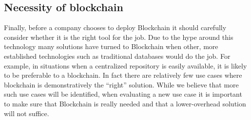 

\subsection{Necessity of blockchain}
Finally, before a company chooses to deploy Blockchain it should carefully consider whether it is the right tool for the job.  Due to the hype around this technology many solutions have turned to Blockchain when other, more established technologies such as traditional databases would do the job. For example, in situations when a centralized repository is easily available, it is likely to be preferable to a blockchain.  In fact there are relatively few use cases where blockchain is demonstratively the ``right'' solution.  While we believe that more such use cases will be identified, when evaluating a new use case it is important to make sure that Blockchain is really needed and that a lower-overhead solution will not suffice.